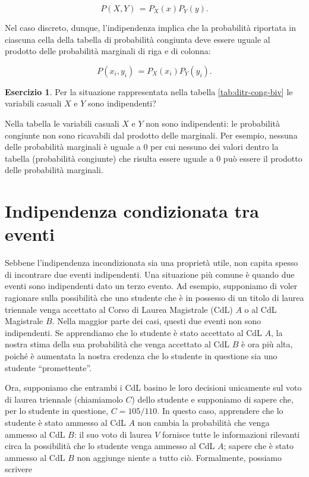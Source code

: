 \documentclass[
  11pt,
]{krantz}
\theoremstyle{definition}
\theoremstyle{definition}
\theoremstyle{definition}
\newtheorem{exercise}{Esercizio}[chapter]
\theoremstyle{definition}
\theoremstyle{remark}
\begin{document}
\begin{equation}
P(X, Y)\, = P_X(x)P_Y(y).
\end{equation}

Nel caso discreto, dunque, l'indipendenza implica che la probabilità riportata in ciascuna cella della tabella di probabilità congiunta deve essere uguale al prodotto delle probabilità marginali di riga e di colonna:

\[
P(x_i, y_i)\, = P_X(x_i) P_Y(y_i).
\]

\begin{exercise}
Per la situazione rappresentata nella tabella \ref{tab:ditr-cong-biv} le variabili casuali \(X\) e \(Y\) sono indipendenti?

Nella tabella le variabili casuali \(X\) e \(Y\) non sono indipendenti: le probabilità congiunte non sono ricavabili dal prodotto delle marginali. Per esempio, nessuna delle probabilità marginali è uguale a \(0\) per cui nessuno dei valori dentro la tabella (probabilità congiunte) che risulta essere uguale a \(0\) può essere il prodotto delle probabilità marginali.
\end{exercise}

\hypertarget{indipendenza-condizionata-tra-eventi}{%
\section{Indipendenza condizionata tra eventi}\label{indipendenza-condizionata-tra-eventi}}

Sebbene l'indipendenza incondizionata sia una proprietà utile, non capita spesso di incontrare due eventi indipendenti. Una situazione più comune è quando due eventi sono indipendenti dato un terzo evento. Ad esempio, supponiamo di voler ragionare sulla possibilità che uno studente che è in possesso di un titolo di laurea triennale venga accettato al Corso di Laurea Magistrale (CdL) \(A\) o al CdL Magistrale \(B\). Nella maggior parte dei casi, questi due eventi non sono indipendenti. Se apprendiamo che lo studente è stato accettato al CdL \(A\), la nostra stima della sua probabilità che venga accettato al CdL \(B\) è ora più alta, poiché è aumentata la nostra credenza che lo studente in questione sia uno studente ``promettente''.

Ora, supponiamo che entrambi i CdL basino le loro decisioni unicamente sul voto di laurea triennale (chiamiamolo \(C\)) dello studente e supponiamo di sapere che, per lo studente in questione, \(C = 105/110\). In questo caso, apprendere che lo studente è stato ammesso al CdL \(A\) non cambia la probabilità che venga ammesso al CdL \(B\): il suo voto di laurea \(V\) fornisce tutte le informazioni rilevanti circa la possibilità che lo studente venga ammesso al CdL \(A\); sapere che è stato ammesso al CdL \(B\) non aggiunge niente a tutto ciò. Formalmente, possiamo scrivere
\end{document}
